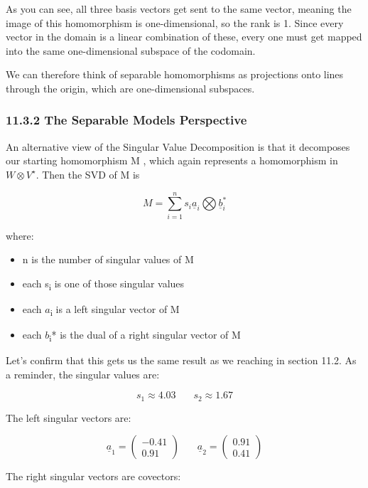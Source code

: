 \documentclass[oneside,english]{amsbook}
\numberwithin{section}{chapter}
\theoremstyle{plain}
\theoremstyle{definition}
\begin{document}
As you can see, all three basis vectors get sent to the same vector,
meaning the image of this homomorphism is one-dimensional, so the rank
is 1. Since every vector in the domain is a linear combination of these,
every one must get mapped into the same one-dimensional subspace of the
codomain.

We can therefore think of separable homomorphisms as projections onto
lines through the origin, which are one-dimensional subspaces.

\subsubsection{11.3.2 The Separable Models
	Perspective}\label{the-separable-models-perspective}

An alternative view of the Singular Value Decomposition is that it
decomposes our starting homomorphism M , which again represents a
homomorphism in $W\otimes V^\star$. Then the SVD of M is

\[M = \sum_{i = 1}^{n}{s_{i}{\underline{a}}_{i}\bigotimes{\underline{b}}_{i}^{*}}\]

where:

\begin{itemize}
	\item
	n is the number of singular values of M
	\item
	each s\textsubscript{i} is one of those singular values
	\item
	each $a$\textsubscript{i} is a left singular vector of M
	\item
	each $b$\textsubscript{i}* is the dual of a right singular vector
	of M
\end{itemize}

Let's confirm that this gets us the same result as we reaching in
section 11.2. As a reminder, the singular values are:

\[s_{1} \approx 4.03\ \ \ \ \ \ \ \ s_{2} \approx 1.67\]

The left singular vectors are:

\[{\underline{a}}_{1} = \begin{pmatrix}
	- 0.41 \\
	0.91
\end{pmatrix}\ \ \ \ \ \ \ \ {\underline{a}}_{2} = \begin{pmatrix}
	0.91 \\
	0.41
\end{pmatrix}\]

The right singular vectors are covectors:
\end{document}
